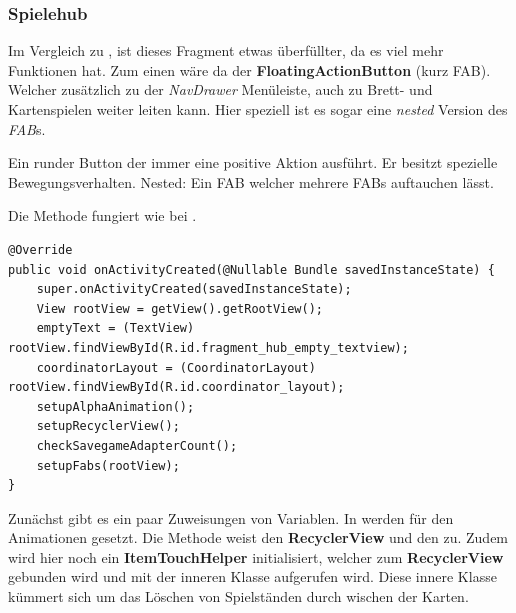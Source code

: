 \subsubsection{Spielehub}

Im Vergleich zu , ist dieses Fragment etwas überfüllter, da
es viel mehr Funktionen hat. Zum einen wäre da der \textbf{FloatingActionButton}
(kurz FAB). Welcher zusätzlich zu der \emph{NavDrawer} Menüleiste, auch zu
Brett- und Kartenspielen weiter leiten kann. Hier speziell ist es sogar eine
\emph{nested} Version des \emph{FAB}s.

\begin{infobox}[frametitle=FloatingActionButton]
Ein runder Button der immer eine positive Aktion ausführt. Er
besitzt spezielle Bewegungsverhalten. Nested: Ein FAB welcher mehrere FABs
auftauchen lässt.
\end{infobox}

Die Methode  fungiert wie bei .

\begin{lstlisting}[caption={Spielehub onActivityCreated() Methode},captionpos=b]
@Override
public void onActivityCreated(@Nullable Bundle savedInstanceState) {
	super.onActivityCreated(savedInstanceState);
	View rootView = getView().getRootView();
	emptyText = (TextView) rootView.findViewById(R.id.fragment_hub_empty_textview);
	coordinatorLayout = (CoordinatorLayout) rootView.findViewById(R.id.coordinator_layout);
	setupAlphaAnimation();
	setupRecyclerView();
	checkSavegameAdapterCount();
	setupFabs(rootView);
}
\end{lstlisting}

Zunächst gibt es ein paar Zuweisungen von Variablen. In
 werden für den  Animationen
gesetzt. Die Methode  weist den \textbf{RecyclerView}
und den  zu. Zudem wird hier noch ein
\textbf{ItemTouchHelper} initialisiert, welcher zum \textbf{RecyclerView}
gebunden wird und mit der inneren Klasse  aufgerufen
wird. Diese innere Klasse kümmert sich um das Löschen von Spielständen durch
wischen der Karten.

